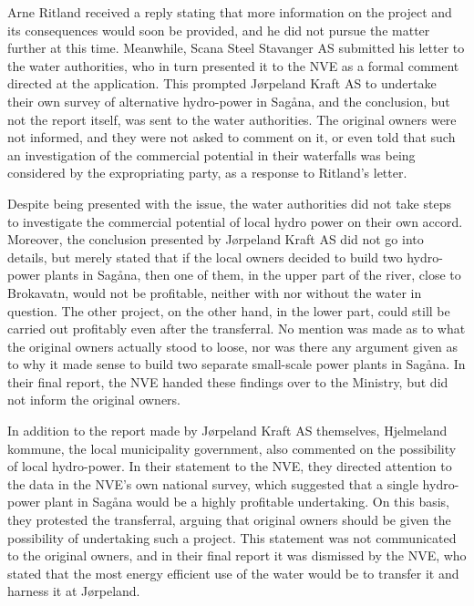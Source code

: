 Arne Ritland received a reply stating that more information on the project and its consequences would soon be provided, and he did not pursue the matter further at this time. Meanwhile, Scana Steel Stavanger AS submitted his letter to the water authorities, who in turn presented it to the NVE as a formal comment directed at the application. This prompted Jørpeland Kraft AS to undertake their own survey of alternative hydro-power in Sagåna, and the conclusion, but not the report itself, was sent to the water authorities. The original owners were not informed, and they were not asked to comment on it, or even told that such an investigation of the commercial potential in their waterfalls was being considered by the expropriating party, as a response to Ritland's letter.

Despite being presented with the issue, the water authorities did not take steps to investigate the commercial potential of local hydro power on their own accord. Moreover, the conclusion presented by Jørpeland Kraft AS did not go into details, but merely stated that if the local owners decided to build two hydro-power plants in Sagåna, then one of them, in the upper part of the river, close to Brokavatn, would not be profitable, neither with nor without the water in question. The other project, on the other hand, in the lower part, could still be carried out profitably even after the transferral. No mention was made as to what the original owners actually stood to loose, nor was there any argument given as to why it made sense to build two separate small-scale power plants in Sagåna. In their final report, the NVE handed these findings over to the Ministry, but did not inform the original owners. 

In addition to the report made by Jørpeland Kraft AS themselves, Hjelmeland kommune, the local municipality government, also commented on the possibility of local hydro-power. In their statement to the NVE, they directed attention to the data in the NVE's own national survey, which suggested that a single hydro-power plant in Sagåna would be a highly profitable undertaking. On this basis, they protested the transferral, arguing that original owners should be given the possibility of undertaking such a project. This statement was not communicated to the original owners, and in their final report it was dismissed by the NVE, who stated that the most energy efficient use of the water would be to transfer it and harness it at Jørpeland.

